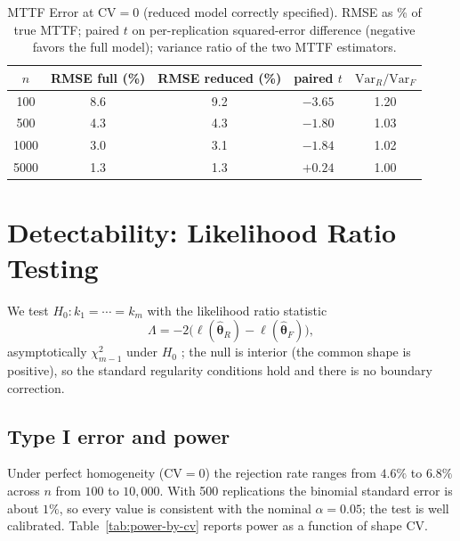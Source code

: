 \documentclass[11pt]{article}
\renewcommand{\v}[1]{\boldsymbol{#1}}
\newcommand{\CV}{\mathrm{CV}}
\begin{document}
\begin{table}[htbp]
\centering
\caption{MTTF Error at $\CV = 0$ (reduced model correctly specified). RMSE as \% of true MTTF; paired $t$ on per-replication squared-error difference (negative favors the full model); variance ratio of the two MTTF estimators.}
\label{tab:mse}
\small
\begin{tabular}{ccccc}
\hline
$n$ & RMSE full (\%) & RMSE reduced (\%) & paired $t$ & $\mathrm{Var}_R/\mathrm{Var}_F$ \\
\hline
100 & 8.6 & 9.2 & $-3.65$ & 1.20 \\
500 & 4.3 & 4.3 & $-1.80$ & 1.03 \\
1000 & 3.0 & 3.1 & $-1.84$ & 1.02 \\
5000 & 1.3 & 1.3 & $+0.24$ & 1.00 \\
\hline
\end{tabular}
\end{table}

\section{Detectability: Likelihood Ratio Testing}
\label{sec:lrt}

We test $H_0: k_1 = \cdots = k_m$ with the likelihood ratio statistic
\begin{equation}
\Lambda = -2\bigl(\ell(\hat{\v\theta}_R) - \ell(\hat{\v\theta}_F)\bigr),
\end{equation}
asymptotically $\chi^2_{m-1}$ under $H_0$ \citep{wilks1938}; the null is interior (the common shape is positive), so the standard regularity conditions hold and there is no boundary correction.

\subsection{Type I error and power}

Under perfect homogeneity ($\CV = 0$) the rejection rate ranges from $4.6\%$ to $6.8\%$ across $n$ from $100$ to $10{,}000$. With 500 replications the binomial standard error is about $1\%$, so every value is consistent with the nominal $\alpha = 0.05$; the test is well calibrated. Table~\ref{tab:power-by-cv} reports power as a function of shape $\CV$.
\end{document}
